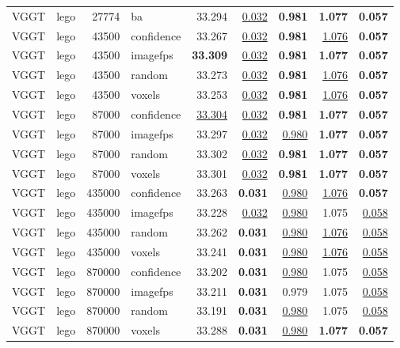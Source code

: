 \begin{table}[H]
\begin{tabular}{llrlrrrrr}
VGGT & lego & 27774 & ba & 33.294 & \underline{0.032} & \textbf{0.981} & \textbf{1.077} & \textbf{0.057} \\
VGGT & lego & 43500 & confidence & 33.267 & \underline{0.032} & \textbf{0.981} & \underline{1.076} & \textbf{0.057} \\
VGGT & lego & 43500 & imagefps & \textbf{33.309} & \underline{0.032} & \textbf{0.981} & \textbf{1.077} & \textbf{0.057} \\
VGGT & lego & 43500 & random & 33.273 & \underline{0.032} & \textbf{0.981} & \underline{1.076} & \textbf{0.057} \\
VGGT & lego & 43500 & voxels & 33.253 & \underline{0.032} & \textbf{0.981} & \underline{1.076} & \textbf{0.057} \\
VGGT & lego & 87000 & confidence & \underline{33.304} & \underline{0.032} & \textbf{0.981} & \textbf{1.077} & \textbf{0.057} \\
VGGT & lego & 87000 & imagefps & 33.297 & \underline{0.032} & \underline{0.980} & \textbf{1.077} & \textbf{0.057} \\
VGGT & lego & 87000 & random & 33.302 & \underline{0.032} & \textbf{0.981} & \textbf{1.077} & \textbf{0.057} \\
VGGT & lego & 87000 & voxels & 33.301 & \underline{0.032} & \textbf{0.981} & \textbf{1.077} & \textbf{0.057} \\
VGGT & lego & 435000 & confidence & 33.263 & \textbf{0.031} & \underline{0.980} & \underline{1.076} & \textbf{0.057} \\
VGGT & lego & 435000 & imagefps & 33.228 & \underline{0.032} & \underline{0.980} & 1.075 & \underline{0.058} \\
VGGT & lego & 435000 & random & 33.262 & \textbf{0.031} & \underline{0.980} & \underline{1.076} & \underline{0.058} \\
VGGT & lego & 435000 & voxels & 33.241 & \textbf{0.031} & \underline{0.980} & \underline{1.076} & \underline{0.058} \\
VGGT & lego & 870000 & confidence & 33.202 & \textbf{0.031} & \underline{0.980} & 1.075 & \underline{0.058} \\
VGGT & lego & 870000 & imagefps & 33.211 & \textbf{0.031} & 0.979 & 1.075 & \underline{0.058} \\
VGGT & lego & 870000 & random & 33.191 & \textbf{0.031} & \underline{0.980} & 1.075 & \underline{0.058} \\
VGGT & lego & 870000 & voxels & 33.288 & \textbf{0.031} & \underline{0.980} & \textbf{1.077} & \textbf{0.057} \\

\end{tabular}
\end{table}
